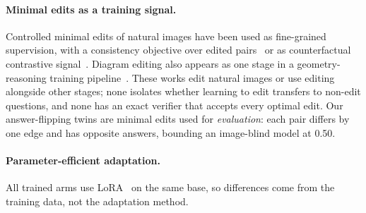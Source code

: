 \paragraph{Minimal edits as a training signal.}
Controlled minimal edits of natural images have been used as fine-grained supervision,
with a consistency objective over edited pairs~\cite{med} or as counterfactual
contrastive signal~\cite{cfvlm}. Diagram editing also appears as one stage in a
geometry-reasoning training pipeline~\cite{geoweave}. These works edit natural images or
use editing alongside other stages; none isolates whether learning to edit transfers to
non-edit questions, and none has an exact verifier that accepts every optimal edit.
Our answer-flipping twins are minimal edits used for \emph{evaluation}: each pair differs
by one edge and has opposite answers, bounding an image-blind model at 0.50.

\paragraph{Parameter-efficient adaptation.}
All trained arms use LoRA~\cite{lora} on the same base, so differences come from the
training data, not the adaptation method.
